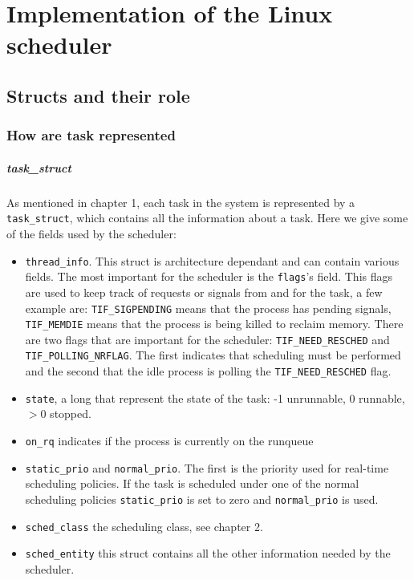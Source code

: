 \chapter{Implementation of the Linux scheduler}
\label{chap:implementation}

\section{Structs and their role}

\subsection{How are task represented}

\paragraph{task\_struct}
As mentioned in chapter 1, each task in the system is represented by a \newline \verb|task_struct|, which contains all the information about a task. Here we give some of the fields used by the scheduler:
\begin{itemize}
    \item \verb|thread_info|. This struct is architecture dependant and can contain various fields. The most important for the scheduler is the \verb|flags|'s field. This flags are used to keep track of requests or signals from and for the task, a few example are: \verb|TIF_SIGPENDING| means that the process has pending signals, \verb|TIF_MEMDIE| means that the process is being killed to reclaim memory. There are two flags that are important for the scheduler: \verb|TIF_NEED_RESCHED| and \verb|TIF_POLLING_NRFLAG|. The first indicates that scheduling must be performed and the second that the idle process is polling the \verb|TIF_NEED_RESCHED| flag. %
    \item \verb|state|, a long that represent the state of the task: -1 unrunnable, 0 runnable, $>0$ stopped. 
    \item \verb|on_rq| indicates if the process is currently on the runqueue
    \item \verb|static_prio| and \verb|normal_prio|. The first is the priority used for real-time scheduling policies. If the task is scheduled under one of the normal scheduling policies \verb|static_prio| is set to zero and \verb|normal_prio| is used.
    \item \verb|sched_class| the scheduling class, see chapter 2.
    \item \verb|sched_entity| this struct contains all the other information needed by the scheduler.
\end{itemize}

